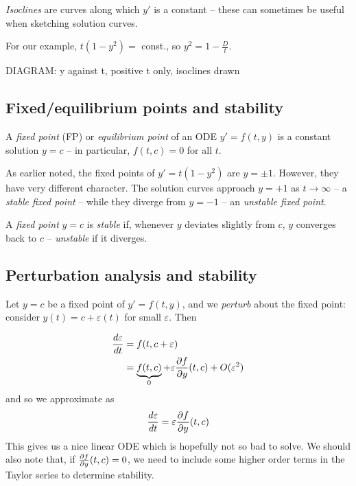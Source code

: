 \documentclass{../../template/note}
\begin{document}
    \begin{definition}[Isoclines]
        \emph{Isoclines} are curves along which \(y'\) is a constant -- these can sometimes be useful when sketching solution curves.
    \end{definition}
    
    \begin{example}
        For our example, \(t(1-y^2)=\) const., so \(y^2 = 1 - \frac{D}{t}\).

        DIAGRAM: y against t, positive t only, isoclines drawn
    \end{example}
    
    \subsection{Fixed/equilibrium points and stability}

    \begin{definition}
        A \emph{fixed point} (FP) or \emph{equilibrium point} of an ODE \(y' = f(t, y)\) is a constant solution \(y=c\) -- in particular, \(f(t, c) = 0\) for all \(t\).
    \end{definition}
    
    \begin{example}
        As earlier noted, the fixed points of \(y' = t(1-y^2)\) are \(y = \pm 1\). However, they have very different character. The solution curves approach \(y=+1\) as \(t \to \infty\) -- a \emph{stable fixed point} -- while they diverge from \(y=-1\) -- an \emph{unstable fixed point}.
    \end{example}
    
    \begin{definition}
        A \emph{fixed point} \(y=c\) is \emph{stable} if, whenever \(y\) deviates slightly from \(c\), \(y\) converges back to \(c\) -- \emph{unstable} if it diverges.
    \end{definition}
    
    \subsection{Perturbation analysis and stability}

    Let \(y=c\) be a fixed point of \(y' = f(t, y)\), and we \emph{perturb} about the fixed point: consider \(y(t) = c + \varepsilon(t)\) for small \(\varepsilon\). Then

    \begin{align*}
        \frac{d\varepsilon}{dt} &= f(t, c + \varepsilon) \\
        &= \underbrace{f(t, c)}_0 + \varepsilon \pd{f}{y}(t, c) + O(\varepsilon^2)
    \end{align*}
    and so we approximate as
    \[
        \frac{d\varepsilon}{dt} = \varepsilon \pd{f}{y}(t,c)
    \]
    This gives us a nice linear ODE which is hopefully not so bad to solve. We should also note that, if \(\pd{f}{y}(t, c) = 0\), we need to include some higher order terms in the Taylor series to determine stability.
\end{document}
